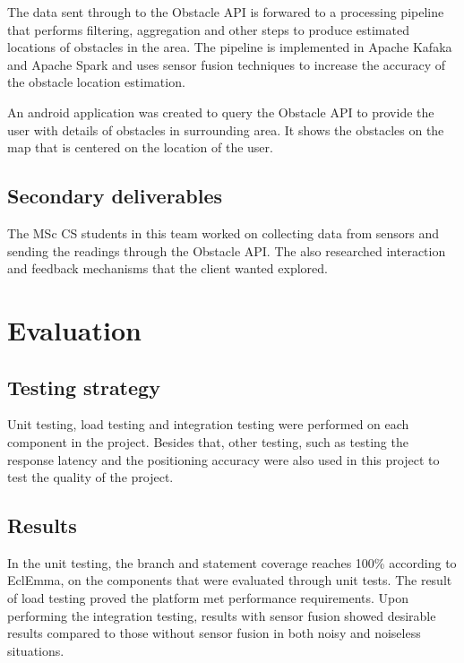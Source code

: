 \documentclass[prodmode,acmtosem]{acmsmall} %
\begin{document}
The data sent through to the Obstacle API is forwared to a processing pipeline that performs filtering, aggregation and other steps to produce estimated locations of obstacles in the area. The pipeline is implemented in Apache Kafaka and Apache Spark and uses sensor fusion techniques to increase the accuracy of the obstacle location estimation. 

An android application was created to query the Obstacle API to provide the user with details of obstacles in surrounding area. It shows the obstacles on the map that is centered on the location of the user.

\subsection{Secondary deliverables}
The MSc CS students in this team worked on collecting data from sensors and sending the readings through the Obstacle API. The also researched interaction and feedback mechanisms that the client wanted explored.

\section{Evaluation}
\subsection{Testing strategy}
Unit testing, load testing and integration testing were performed on each component in the project. Besides that, other testing, such as testing the response latency and the positioning accuracy were also used in this project to test the quality of the project.
\subsection{Results}
In the unit testing, the branch and statement coverage reaches 100\% according to EclEmma, on the components that were evaluated through unit tests. The result of load testing proved the platform met performance requirements. Upon performing the integration testing, results with sensor fusion showed desirable results compared to those without sensor fusion in both noisy and noiseless situations.
\end{document}
